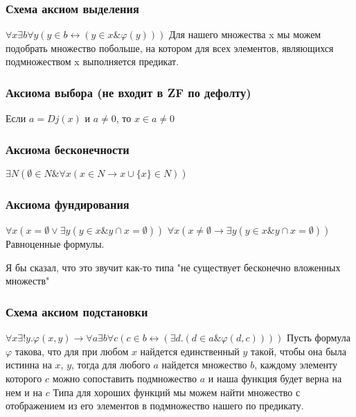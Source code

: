 \documentclass[12pt]{article}
\renewcommand{\phi}{\varphi}
\begin{document}
\subsubsection{Схема аксиом выделения}
\label{sec-2-40-5}
$∀x\exists b∀y(y \in b \leftrightarrow (y \in x \& \phi(y)))$
Для нашего множества x мы можем подобрать множество побольше,
на котором для всех элементов, являющихся подмножеством x
выполняется предикат.
\subsubsection{Аксиома выбора (не входит в ZF по дефолту)}
\label{sec-2-40-6}
Если $a = Dj(x)$ и $a \ne  0$, то $x \in a \ne  0$
\subsubsection{Аксиома бесконечности}
\label{sec-2-40-7}
$\exists N(∅ \in N \& ∀x(x \in N \to x ∪ \{x\} \in N))$
\subsubsection{Аксиома фундирования}
\label{sec-2-40-8}
$∀x(x = ∅ \lor \exists y(y \in x \& y ∩ x = ∅))$
$∀x(x \ne  ∅ \to \exists y(y \in x \& y ∩ x = ∅))$
Равноценные формулы.

Я бы сказал, что это звучит как-то типа
"не существует бесконечно вложенных множеств"
\subsubsection{Схема аксиом подстановки}
\label{sec-2-40-9}
$∀x\exists !y.\phi(x,y) \to ∀a\exists b∀c(c \in b \leftrightarrow (\exists d.(d \in a \& \phi(d, c))))$
Пусть формула $\phi$ такова, что для при любом $x$ найдется единственный $y$
такой, чтобы она была истинна на $x$, $y$, тогда для любого $a$
найдется множество $b$, каждому элементу которого $c$ можно сопоставить
подмножество $a$ и наша функция будет верна на нем и на $c$
Типа для хороших функций мы можем найти множество с отображением из
его элементов в подмножество нашего по предикату.
\end{document}
